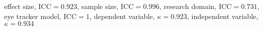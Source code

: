 effect size, $\textrm{ICC} = 0.923$, sample size, $\textrm{ICC} = 0.996$, research domain, $\textrm{ICC} = 0.731$, eye tracker model, $\textrm{ICC} = 1$, dependent variable, $\kappa = 0.923$, independent variable, $\kappa = 0.934$
